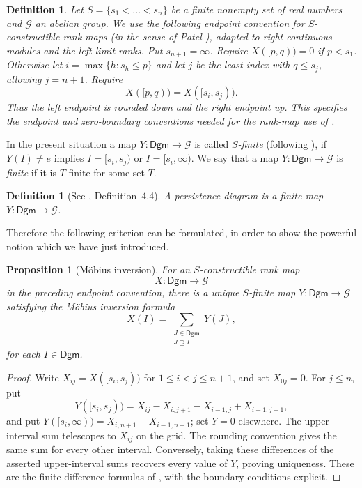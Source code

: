 \documentclass{amsart}
\newtheorem{proposition}[theorem]{Proposition}
\newtheorem{definition}[theorem]{Definition}
\begin{document}
\begin{definition}
Let $S = \{s_1 < \dots < s_n\}$ be a finite nonempty set of real numbers and $\mathcal{G}$ an abelian group. We use the following endpoint convention for \textit{$S$-constructible rank maps} (in the sense of Patel \cite[Section~7]{patel2016generalized}), adapted to right-continuous modules and the left-limit ranks. Put $s_{n+1}=\infty$. Require $X([p,q))=0$ if $p<s_1$. Otherwise let $i=\max\{h:s_h\leq p\}$ and let $j$ be the least index with $q\leq s_j$, allowing $j=n+1$. Require
\[
X([p,q))=X([s_i,s_j)).
\]
Thus the left endpoint is rounded down and the right endpoint up. This specifies the endpoint and zero-boundary conventions needed for the rank-map use of \cite[Definition~4.2 and Theorem~4.1]{patel2016generalized}. %
\end{definition}

In the present situation a map $Y \colon \mathsf{Dgm} \to \mathcal{G}$ is  called \textit{$S$-finite} (following \cite[Definition~4.3]{patel2016generalized}), if $Y(I) \neq e$ implies $I = [s_i, s_j)$ or $I = [s_i, \infty)$. We say that a map $Y \colon \mathsf{Dgm} \to \mathcal{G}$ is \textit{finite} if it is $T$-finite for some set $T$.


\begin{definition}[See \cite{patel2016generalized}, Definition~4.4] 
A \textit{persistence diagram} is a finite map $Y \colon \mathsf{Dgm} \to \mathcal{G}$.
\end{definition}

Therefore the following criterion can be formulated, in order to show the powerful notion which we have just introduced.

\begin{proposition}[M\"obius inversion]\label{mif}
For an $S$-constructible rank map $$X \colon \mathsf{Dgm} \to \mathcal{G}$$ in the preceding endpoint convention, there is a unique $S$-finite map $Y \colon \mathsf{Dgm} \to \mathcal{G}$ satisfying the Möbius inversion formula
$$ X(I) = \sum_{\substack{J \in \mathsf{Dgm}\\ J \supseteq I}} Y(J), $$
for each $I \in \mathsf{Dgm}$.
\end{proposition}
\begin{proof}
Write $X_{ij}=X([s_i,s_j))$ for $1\leq i<j\leq n+1$, and set $X_{0j}=0$. For $j\leq n$, put
\[
Y([s_i,s_j))=X_{ij}-X_{i,j+1}-X_{i-1,j}+X_{i-1,j+1},
\]
and put $Y([s_i,\infty))=X_{i,n+1}-X_{i-1,n+1}$; set $Y=0$ elsewhere. The upper-interval sum telescopes to $X_{ij}$ on the grid. The rounding convention gives the same sum for every other interval. Conversely, taking these differences of the asserted upper-interval sums recovers every value of $Y$, proving uniqueness. These are the finite-difference formulas of \cite[Theorem~4.1, pp.~403--404]{patel2016generalized}, with the boundary conditions explicit.
\end{proof}
\end{document}
